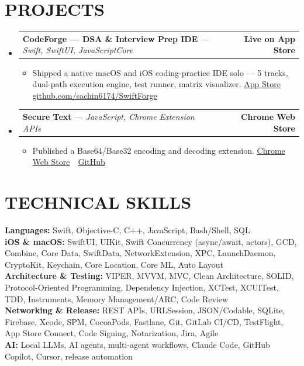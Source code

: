 \documentclass[letterpaper,10pt]{article}
\makeatletter
\newcommand{\resumeItem}[1]{\item\small{{#1 \vspace{-3pt}}}}
\newcommand{\resumeProjectHeading}[2]{
    \item
    \begin{tabular*}{1.001\textwidth}{l@{\extracolsep{\fill}}r}
      \small#1 & \textbf{\small #2}\\
    \end{tabular*}\vspace{-7pt}
}
\newcommand{\resumeSubHeadingListStart}{\begin{itemize}[leftmargin=0.0in, label={}]}
\newcommand{\resumeSubHeadingListEnd}{\end{itemize}}
\newcommand{\resumeItemListStart}{\begin{itemize}}
\newcommand{\resumeItemListEnd}{\end{itemize}\vspace{-6pt}}
\makeatother
\begin{document}
\section{PROJECTS}
    \vspace{1pt}
    \resumeSubHeadingListStart
        \resumeProjectHeading
            {\textbf{CodeForge — DSA \& Interview Prep IDE} \small{\textit{— Swift, SwiftUI, JavaScriptCore}}}{Live on App Store}
            \resumeItemListStart
                \resumeItem{Shipped a native macOS and iOS coding-practice IDE solo — 5 tracks, dual-path execution engine, test runner, matrix visualizer. \href{https://apps.apple.com/in/app/codeforge-dsa-interview-prep/id6787703716}{App Store} \,\textbar\, \href{https://github.com/sachin6174/SwiftForge}{github.com/sachin6174/SwiftForge}}
            \resumeItemListEnd
            \vspace{-9pt}
        \resumeProjectHeading
            {\textbf{Secure Text} \small{\textit{— JavaScript, Chrome Extension APIs}}}{Chrome Web Store}
            \resumeItemListStart
                \resumeItem{Published a Base64/Base32 encoding and decoding extension. \href{https://chromewebstore.google.com/detail/secure-text/ankgchfieiimiijhlcjcongijapefmei}{Chrome Web Store} \,\textbar\, \href{https://github.com/sachin6174/secure-text-chrome-extension}{GitHub}}
            \resumeItemListEnd
            \vspace{-9pt}
    \resumeSubHeadingListEnd

\vspace{-3pt}

\section{TECHNICAL SKILLS}
 \begin{itemize}[leftmargin=0.15in, label={}]
    \small{\item{
     \textbf{Languages:} Swift, Objective-C, C++, JavaScript, Bash/Shell, SQL \\ \vspace{1pt}
     \textbf{iOS \& macOS:} SwiftUI, UIKit, Swift Concurrency (async/await, actors), GCD, Combine, Core Data, SwiftData, NetworkExtension, XPC, LaunchDaemon, CryptoKit, Keychain, Core Location, Core ML, Auto Layout \\ \vspace{1pt}
     \textbf{Architecture \& Testing:} VIPER, MVVM, MVC, Clean Architecture, SOLID, Protocol-Oriented Programming, Dependency Injection, XCTest, XCUITest, TDD, Instruments, Memory Management/ARC, Code Review \\ \vspace{1pt}
     \textbf{Networking \& Release:} REST APIs, URLSession, JSON/Codable, SQLite, Firebase, Xcode, SPM, CocoaPods, Fastlane, Git, GitLab CI/CD, TestFlight, App Store Connect, Code Signing, Notarization, Jira, Agile \\ \vspace{1pt}
     \textbf{AI:} Local LLMs, AI agents, multi-agent workflows, Claude Code, GitHub Copilot, Cursor, release automation
    }}
 \end{itemize}
\end{document}
